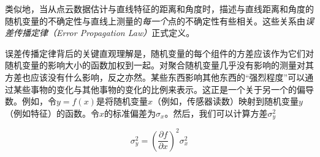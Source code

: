 
类似地，当从点云数据估计与直线特征的距离和角度时，描述与直线距离和角度的随机变量的不确定性与直线上测量的\emph{每一个}点的不确定性有些相关。这些关系由\emph{误差传播定律（Error Propagation Law）}正式定义。


误差传播定律背后的关键直观理解是，随机变量的每个组件的方差应该作为它们对随机变量的影响大小的函数加权到一起。对聚合随机变量几乎没有影响的测量对其方差也应该没有什么影响，反之亦然。某些东西影响其他东西的“强烈程度”可以通过某些事物的变化与其他事物的变化的比例来表示。这正是一个关于另一个的偏导数。例如，令$y=f(x)$是将随机变量$x$（例如，传感器读数）映射到随机变量$y$（例如特征）的函数。令$x$的标准偏差为$\sigma_x$。然后，我们可以计算方差$\sigma_y^2$

\begin{equation}
\sigma_y^2=\left(\frac{\partial f}{\partial x}\right)^2 \sigma_x^2
\end{equation}


